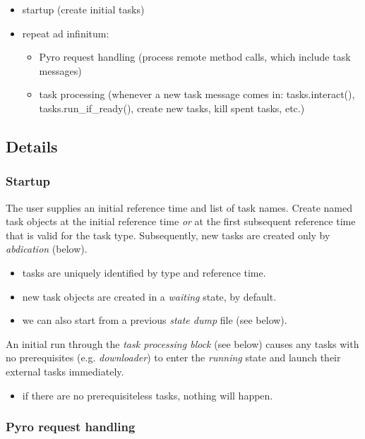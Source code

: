 \documentclass[12pt]{amsart}
\begin{document}
\begin{itemize}
    \item startup (create initial tasks)
    \item repeat ad infinitum:
    \begin{itemize}
        \item Pyro request handling (process remote method calls, which
        include task messages)
        \item task processing (whenever a new task message comes in:
        tasks.interact(), tasks.run\_if\_ready(), create new tasks, kill
        spent tasks, etc.)
    \end{itemize}
\end{itemize}


\subsection{Details}

\subsubsection{Startup}

The user supplies an initial reference time and list of task names.
Create named task objects at the initial reference time {\em or} at the
first subsequent reference time that is valid for the task type.
Subsequently, new tasks are created only by {\em abdication} (below).
    \begin{itemize}
        \item tasks are uniquely identified by type and reference time. 
        \item new task objects are created in a {\em waiting} state, by
        default.
        \item we can also start from a previous {\em state dump} file
        (see below).
    \end{itemize}


An initial run through the {\em task processing block} (see below)
causes any tasks with no prerequisites (e.g. {\em downloader}) to enter the
{\em running} state and launch their external tasks immediately.
    \begin{itemize}
    \item if there are no prerequisiteless tasks, nothing will happen.
    \end{itemize}

\subsubsection{Pyro request handling}
\end{document}
